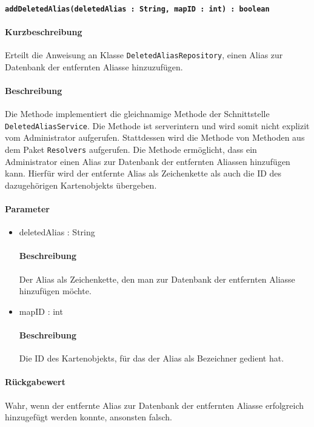 \paragraph*{\texttt{addDeletedAlias(deletedAlias : String, mapID : int) : boolean}}%
\paragraph*{Kurzbeschreibung}
Erteilt die Anweisung an Klasse \texttt{DeletedAliasRepository}, einen Alias zur Datenbank der entfernten Aliasse hinzuzufügen.
\paragraph*{Beschreibung}
Die Methode implementiert die gleichnamige Methode der Schnittstelle \texttt{DeletedAliasService}.
Die Methode ist serverintern und wird somit nicht explizit vom Administrator aufgerufen.
Stattdessen wird die Methode von Methoden aus dem Paket \texttt{Resolvers} aufgerufen.
Die Methode ermöglicht, dass ein Administrator einen Alias zur Datenbank der entfernten Aliassen hinzufügen kann.
Hierfür wird der entfernte Alias als Zeichenkette als auch die ID des dazugehörigen Kartenobjekts übergeben.
\paragraph*{Parameter}
\begin{itemize}
    \item deletedAlias : String
    		\paragraph*{Beschreibung}
    		Der Alias als Zeichenkette, den man zur Datenbank der entfernten Aliasse hinzufügen möchte.
    \item mapID : int
    		\paragraph*{Beschreibung}
    		Die ID des Kartenobjekts, für das der Alias als Bezeichner gedient hat.
\end{itemize}
\paragraph*{Rückgabewert}
Wahr, wenn der entfernte Alias zur Datenbank der entfernten Aliasse erfolgreich hinzugefügt werden konnte, ansonsten falsch.
